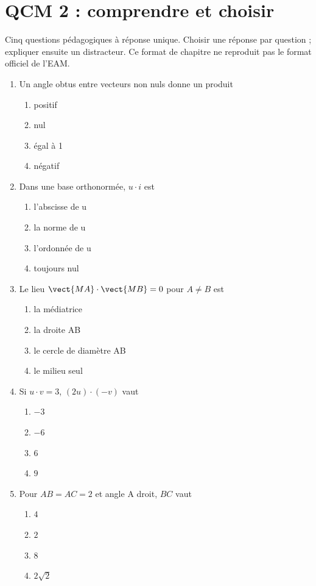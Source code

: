 \endgroup
\begingroup\small
{}\section*{QCM 2 : comprendre et choisir}\label{C03-Q2}
Cinq questions pédagogiques à réponse unique. Choisir une réponse par question ; expliquer ensuite un distracteur. Ce format de chapitre ne reproduit pas le format officiel de l’EAM.
\begin{enumerate}
\item Un angle obtus entre vecteurs non nuls donne un produit
\begin{enumerate}[label=\Alph*.,itemsep=2pt]
\item positif
\item nul
\item égal à 1
\item négatif
\end{enumerate}
\item Dans une base orthonormée, $u\cdot i$ est
\begin{enumerate}[label=\Alph*.,itemsep=2pt]
\item l’abscisse de u
\item la norme de u
\item l’ordonnée de u
\item toujours nul
\end{enumerate}
\item Le lieu $\vect{MA}\cdot\vect{MB}=0$ pour $A\ne B$ est
\begin{enumerate}[label=\Alph*.,itemsep=2pt]
\item la médiatrice
\item la droite AB
\item le cercle de diamètre AB
\item le milieu seul
\end{enumerate}
\item Si $u\cdot v=3$, $(2u)\cdot(-v)$ vaut
\begin{enumerate}[label=\Alph*.,itemsep=2pt]
\item $-3$
\item $-6$
\item $6$
\item $9$
\end{enumerate}
\item Pour $AB=AC=2$ et angle A droit, $BC$ vaut
\begin{enumerate}[label=\Alph*.,itemsep=2pt]
\item $4$
\item $2$
\item $8$
\item $2\sqrt2$
\end{enumerate}
\end{enumerate}
